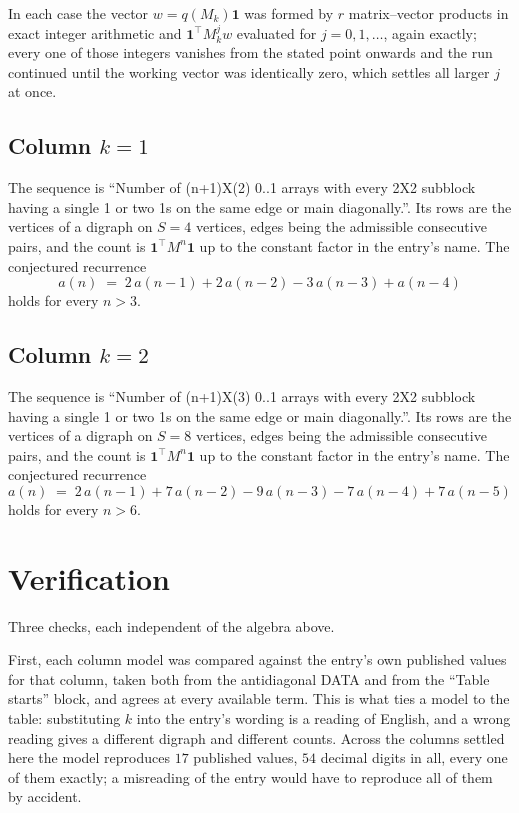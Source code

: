\documentclass[11pt,a4paper]{article}
\theoremstyle{plain}
\theoremstyle{definition}
\begin{document}
In each case the vector $w=q(M_k)\mathbf{1}$ was formed by $r$ matrix--vector products in
exact integer arithmetic and $\mathbf{1}^{\!\top}M_k^{j}w$ evaluated for $j=0,1,\dots$,
again exactly; every one of those integers vanishes from the stated point onwards and the run
continued until the working vector was identically zero, which settles all larger $j$ at once.

\subsection*{Column $k=1$}
The sequence is ``Number of (n+1)X(2) 0..1 arrays with every 2X2 subblock having a single 1 or two 1s on the same edge or main diagonally.''. Its rows are the vertices of a digraph on
$S=4$ vertices, edges being the admissible consecutive pairs, and the count is
$\mathbf{1}^{\!\top}M^{n}\mathbf{1}$ up to the constant factor in the entry's name.
The conjectured recurrence
\[
a(n)\;=\;2\,a(n-1) + 2\,a(n-2) - 3\,a(n-3) + a(n-4)
\]
holds for every $n>3$.

\subsection*{Column $k=2$}
The sequence is ``Number of (n+1)X(3) 0..1 arrays with every 2X2 subblock having a single 1 or two 1s on the same edge or main diagonally.''. Its rows are the vertices of a digraph on
$S=8$ vertices, edges being the admissible consecutive pairs, and the count is
$\mathbf{1}^{\!\top}M^{n}\mathbf{1}$ up to the constant factor in the entry's name.
The conjectured recurrence
\[
a(n)\;=\;2\,a(n-1) + 7\,a(n-2) - 9\,a(n-3) - 7\,a(n-4) + 7\,a(n-5)
\]
holds for every $n>6$.

\section{Verification}

Three checks, each independent of the algebra above.

First, each column model was compared against the entry's own published values for that
column, taken both from the antidiagonal DATA and from the ``Table starts'' block, and agrees
at every available term. This is what ties a model to the table: substituting $k$ into the
entry's wording is a reading of English, and a wrong reading gives a different digraph and
different counts. Across the columns settled here the model reproduces $17$ published
values, $54$ decimal digits in all, every one of them exactly; a misreading of the entry
would have to reproduce all of them by accident.
\end{document}
